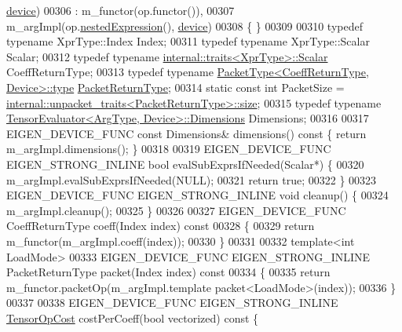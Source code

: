 \begin{DoxyCode}
      \hyperlink{struct_eigen_1_1_tensor_evaluator_a98b51809ed8f7a1f736eb7b952b9636e}{device})
00306     : m\_functor(op.functor()),
00307       m\_argImpl(op.\hyperlink{class_eigen_1_1_tensor_cwise_unary_op_af3a260b2117072817e641d72038cce51}{nestedExpression}(), \hyperlink{struct_eigen_1_1_tensor_evaluator_a98b51809ed8f7a1f736eb7b952b9636e}{device})
00308   \{ \}
00309 
00310   \textcolor{keyword}{typedef} \textcolor{keyword}{typename} XprType::Index Index;
00311   \textcolor{keyword}{typedef} \textcolor{keyword}{typename} XprType::Scalar Scalar;
00312   \textcolor{keyword}{typedef} \textcolor{keyword}{typename} \hyperlink{struct_eigen_1_1internal_1_1traits}{internal::traits<XprType>::Scalar} CoeffReturnType;
00313   \textcolor{keyword}{typedef} \textcolor{keyword}{typename} \hyperlink{group___sparse_core___module}{PacketType<CoeffReturnType, Device>::type} 
      \hyperlink{group___sparse_core___module}{PacketReturnType};
00314   \textcolor{keyword}{static} \textcolor{keyword}{const} \textcolor{keywordtype}{int} PacketSize = 
      \hyperlink{struct_eigen_1_1internal_1_1unpacket__traits}{internal::unpacket\_traits<PacketReturnType>::size};
00315   \textcolor{keyword}{typedef} \textcolor{keyword}{typename} \hyperlink{struct_eigen_1_1_tensor_evaluator}{TensorEvaluator<ArgType, Device>::Dimensions}
       Dimensions;
00316 
00317   EIGEN\_DEVICE\_FUNC \textcolor{keyword}{const} Dimensions& dimensions()\textcolor{keyword}{ const }\{ \textcolor{keywordflow}{return} m\_argImpl.dimensions(); \}
00318 
00319   EIGEN\_DEVICE\_FUNC EIGEN\_STRONG\_INLINE \textcolor{keywordtype}{bool} evalSubExprsIfNeeded(Scalar*) \{
00320     m\_argImpl.evalSubExprsIfNeeded(NULL);
00321     \textcolor{keywordflow}{return} \textcolor{keyword}{true};
00322   \}
00323   EIGEN\_DEVICE\_FUNC EIGEN\_STRONG\_INLINE \textcolor{keywordtype}{void} cleanup() \{
00324     m\_argImpl.cleanup();
00325   \}
00326 
00327   EIGEN\_DEVICE\_FUNC CoeffReturnType coeff(Index index)\textcolor{keyword}{ const}
00328 \textcolor{keyword}{  }\{
00329     \textcolor{keywordflow}{return} m\_functor(m\_argImpl.coeff(index));
00330   \}
00331 
00332   \textcolor{keyword}{template}<\textcolor{keywordtype}{int} LoadMode>
00333   EIGEN\_DEVICE\_FUNC EIGEN\_STRONG\_INLINE PacketReturnType packet(Index index)\textcolor{keyword}{ const}
00334 \textcolor{keyword}{  }\{
00335     \textcolor{keywordflow}{return} m\_functor.packetOp(m\_argImpl.template packet<LoadMode>(index));
00336   \}
00337 
00338   EIGEN\_DEVICE\_FUNC EIGEN\_STRONG\_INLINE \hyperlink{class_eigen_1_1_tensor_op_cost}{TensorOpCost} costPerCoeff(\textcolor{keywordtype}{bool} vectorized)\textcolor{keyword}{ const }\{

\end{DoxyCode}
